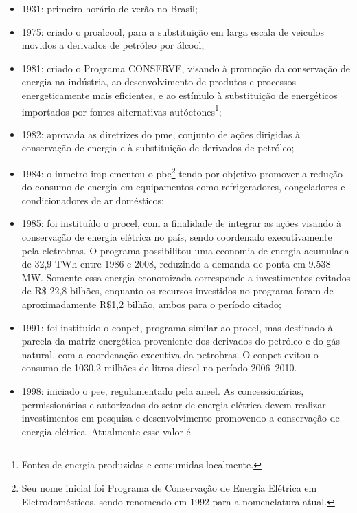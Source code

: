 \begin{itemize}
\item 1931: primeiro horário de verão no Brasil;
\item 1975: criado o \gls{proalcool}, para a substituição em larga
escala de veiculos movidos a derivados de petróleo por álcool; 
\item 1981: criado o Programa CONSERVE, visando à promoção da
conservação de energia na indústria, ao desenvolvimento de produtos e
processos energeticamente mais eficientes, e ao estímulo à
substituição de energéticos importados por fontes alternativas
autóctones\footnote{Fontes de energia produzidas e consumidas
localmente.};
\item 1982: aprovada as diretrizes do \gls{pme}, conjunto de ações
dirigidas à conservação de energia e à substituição de derivados de
petróleo;
\item 1984: o \gls{inmetro} implementou o \gls{pbe}\footnote{Seu nome
inicial foi Programa de Conservação de Energia Elétrica em
Eletrodomésticos, sendo renomeado em 1992 para a nomenclatura atual.}
tendo por objetivo promover a redução do consumo de energia em
equipamentos como refrigeradores, congeladores e condicionadores de ar
domésticos;
\item 1985: foi instituído o \gls{procel}, com a finalidade de
integrar as ações visando à conservação de energia elétrica no país,
sendo coordenado executivamente pela \acs{eletrobras}. O programa
possibilitou uma economia de energia acumulada de 32,9 TWh entre 1986
e 2008, reduzindo a demanda de ponta em 9.538 MW. Somente essa energia
economizada corresponde a investimentos evitados de $\text{R\$}$ 22,8
bilhões, enquanto os recursos investidos no programa foram de
aproximadamente $\text{R\$}$1,2 bilhão, ambos para o período citado; 
\item 1991: foi instituído o \gls{conpet}, programa similar ao
\gls{procel}, mas destinado à parcela da matriz energética proveniente
dos derivados do petróleo e do gás natural, com a coordenação
executiva da \acs{petrobras}.  O \gls{conpet} evitou o consumo de
1030,2 milhões de litros diesel no período 2006--2010. 
\item 1998: iniciado o \gls{pee}, regulamentado pela \gls{aneel}. As
concessionárias, permissionárias e autorizadas do setor de energia
elétrica devem realizar investimentos em pesquisa e desenvolvimento
promovendo a conservação de energia elétrica.  Atualmente esse valor é

\end{itemize}
